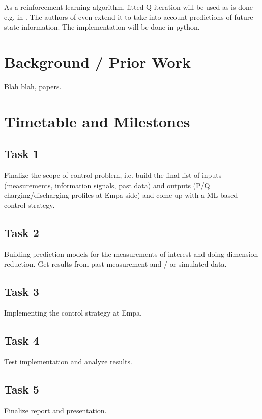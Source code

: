 \documentclass[letterpaper]{scrartcl}
\begin{document}
	As a reinforcement learning algorithm, fitted Q-iteration
	will be used as is done e.g. in \cite{7401112, 7178338, 8727484, 7056534}.
	The authors of \cite{7401112} even extend it to take into account
	predictions of future state information. 
	The implementation will be done in python.
	
	\section{Background / Prior Work}
	
	Blah blah, papers.
	
	\section{Timetable and Milestones}
	
	\subsection{Task 1}
	
	Finalize the scope of control problem, i.e. build the final list of inputs  (measurements, information signals, past data) and outputs (P/Q charging/discharging profiles at Empa side) and 
	come up with a ML-based control strategy.
	
	\subsection{Task 2}
	
	Building prediction models for the measurements of interest and doing dimension reduction. Get results from past measurement and / or simulated data.
	
	\subsection{Task 3}
	
	Implementing the control strategy at Empa.
	
	\subsection{Task 4}
	
	Test implementation and analyze results.
	
	\subsection{Task 5}
	
	Finalize report and presentation.
	
	
	\printbibliography
	
	
\end{document}
